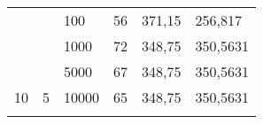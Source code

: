 \documentclass{article}
\begin{document}
\begin{table}[h]
\begin{tabular}{llllll}
			&                                                                       &                                                                           &                                                                              &                                                                                     &                                                                                       \\ \hline
			\multicolumn{1}{|l|}{}                                                 & \multicolumn{1}{l|}{}                                                 & \multicolumn{1}{l|}{100}                                                  & \multicolumn{1}{l|}{56}                                                      & \multicolumn{1}{l|}{371,15}                                                         & \multicolumn{1}{l|}{256,817}                                                          \\ \cline{3-6} 
			\multicolumn{1}{|l|}{}                                                 & \multicolumn{1}{l|}{}                                                 & \multicolumn{1}{l|}{1000}                                                 & \multicolumn{1}{l|}{72}                                                      & \multicolumn{1}{l|}{348,75}                                                         & \multicolumn{1}{l|}{350,5631}                                                         \\ \cline{3-6} 
			\multicolumn{1}{|l|}{}                                                 & \multicolumn{1}{l|}{}                                                 & \multicolumn{1}{l|}{5000}                                                 & \multicolumn{1}{l|}{67}                                                      & \multicolumn{1}{l|}{348,75}                                                         & \multicolumn{1}{l|}{350,5631}                                                         \\ \cline{3-6} 
			\multicolumn{1}{|l|}{\multirow{-4}{*}{10}}                             & \multicolumn{1}{l|}{\multirow{-4}{*}{5}}                              & \multicolumn{1}{l|}{10000}                                                & \multicolumn{1}{l|}{65}                                                      & \multicolumn{1}{l|}{348,75}                                                         & \multicolumn{1}{l|}{350,5631}                                                         \\ \hline
			&                                                                       &                                                                           &                                                                              &                                                                                     &                                                                                       \\ \hline

\end{tabular}
\end{table}
\end{document}
